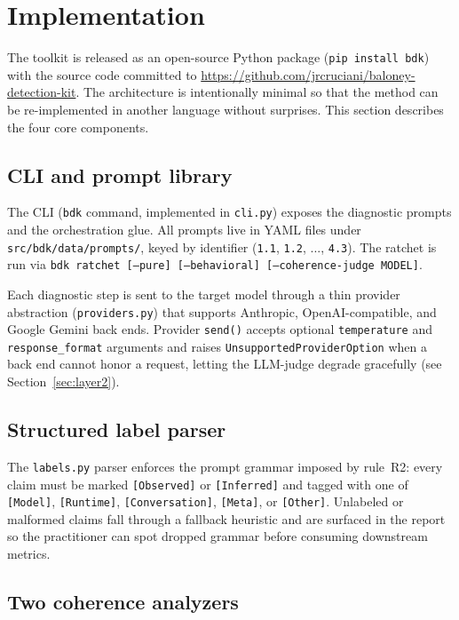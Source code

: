 \section{Implementation}
\label{sec:implementation}

The toolkit is released as an open-source Python package
(\texttt{pip install bdk}) with the source code committed to
\url{https://github.com/jrcruciani/baloney-detection-kit}. The architecture
is intentionally minimal so that the method can be re-implemented in
another language without surprises. This section describes the four
core components.

\subsection{CLI and prompt library}

The CLI (\texttt{bdk} command, implemented in \texttt{cli.py})
exposes the diagnostic prompts and the orchestration glue. All prompts
live in YAML files under \texttt{src/bdk/data/prompts/}, keyed
by identifier (\texttt{1.1}, \texttt{1.2}, ..., \texttt{4.3}). The
ratchet is run via \texttt{bdk ratchet [--pure] [--behavioral]
[--coherence-judge MODEL]}.

Each diagnostic step is sent to the target model through a thin
provider abstraction (\texttt{providers.py}) that supports
Anthropic, OpenAI-compatible, and Google Gemini back ends. Provider
\texttt{send()} accepts optional \texttt{temperature} and
\texttt{response\_format} arguments and raises
\texttt{UnsupportedProviderOption} when a back end cannot honor a
request, letting the LLM-judge degrade gracefully (see
Section~\ref{sec:layer2}).

\subsection{Structured label parser}

The \texttt{labels.py} parser enforces the prompt grammar imposed by
rule~R2: every claim must be marked \texttt{[Observed]} or
\texttt{[Inferred]} and tagged with one of \texttt{[Model]},
\texttt{[Runtime]}, \texttt{[Conversation]}, \texttt{[Meta]}, or
\texttt{[Other]}. Unlabeled or malformed claims fall through a
fallback heuristic and are surfaced in the report so the practitioner
can spot dropped grammar before consuming downstream metrics.

\subsection{Two coherence analyzers}

